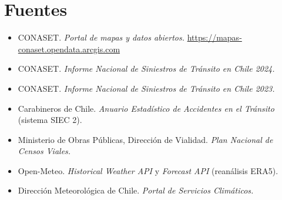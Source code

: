 \documentclass[11pt,a4paper]{article}
\begin{document}
\section{Fuentes}

\begin{itemize}
  \item CONASET. \emph{Portal de mapas y datos abiertos.}
  \url{https://mapas-conaset.opendata.arcgis.com}
  \item CONASET. \emph{Informe Nacional de Siniestros de Tránsito en Chile
  2024.}
  \item CONASET. \emph{Informe Nacional de Siniestros de Tránsito en Chile
  2023.}
  \item Carabineros de Chile. \emph{Anuario Estadístico de Accidentes en el
  Tránsito} (sistema SIEC 2).
  \item Ministerio de Obras Públicas, Dirección de Vialidad. \emph{Plan Nacional
  de Censos Viales.}
  \item Open-Meteo. \emph{Historical Weather API} y \emph{Forecast API}
  (reanálisis ERA5).
  \item Dirección Meteorológica de Chile. \emph{Portal de Servicios Climáticos.}
\end{itemize}
\end{document}
